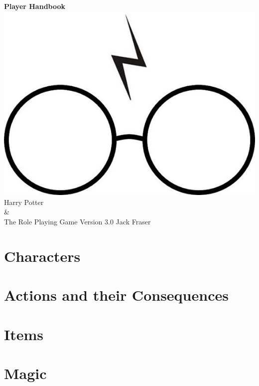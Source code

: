 \documentclass[oneside, twocolumn,9pt]{extbook}
\begin{document}
\begin{titlepage}
    \centering
    \vfill
    {\bfseries
        {\HP \fontsize{40}{35}\selectfont Player Handbook}
    }    
    \vfill
    \includegraphics[scale = 0.7]{../Images/glasses} %
    \vfill
    {\HP \fontsize{30}{24} \selectfont  Harry Potter \\\&\\ The Role Playing Game}
    \normalsize
    \vfill
    {\HP \fontsize{22}{0} \selectfont Version 3.0 \hfill Jack Fraser}
\end{titlepage}

\footnotesize
\tableofcontents
\normalsize




\part{Characters} \label{C:CharacterCreation}






\part{Actions and their Consequences}







\part{Items}







\part{Magic}

\end{document}

